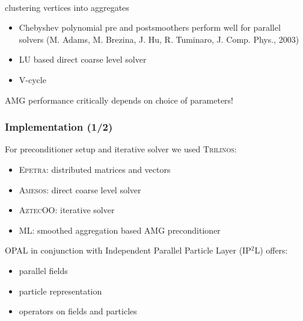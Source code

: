 \documentclass[xcolor=pdftex,table,10pt]{beamer}
\newcommand{\opal}{\textsc{OPAL }}
\begin{document}
\begin{frame}
\begin{minipage}[b]{0.3\textwidth}
                \scriptsize{\\clustering vertices into aggregates}

        \end{minipage} 
        \begin{itemize}
			    \item Chebyshev polynomial {\color{blue!60}pre and postsmoothers} perform well for parallel solvers (M. Adams, M. Brezina, J. Hu, R. Tuminaro, J. Comp. Phys., 2003)
    		    \item LU based direct {\color{blue!60}coarse level solver}
                \item V-cycle
        \end{itemize}

            \vspace{0.3cm}
            \alert{AMG performance critically depends on choice of parameters!}

	\end{frame}

	\begin{frame}
		\frametitle{Implementation (1/2)}

		For preconditioner setup and iterative solver we used \textsc{Trilinos}:
		\begin{itemize}
			\item \textsc{Epetra}: distributed matrices and vectors
			\item \textsc{Amesos}: direct coarse level solver
			\item \textsc{AztecOO}: iterative solver
			\item \textsc{ML}: smoothed aggregation based AMG preconditioner
		\end{itemize}

		\vspace{0.8cm}

		\opal in conjunction with Independent Parallel Particle Layer (\textsc{IP$^2$L}) offers:
		\begin{itemize}
			\item parallel fields
			\item particle representation
			\item operators on fields and particles
		\end{itemize}

	\end{frame}
\end{document}
